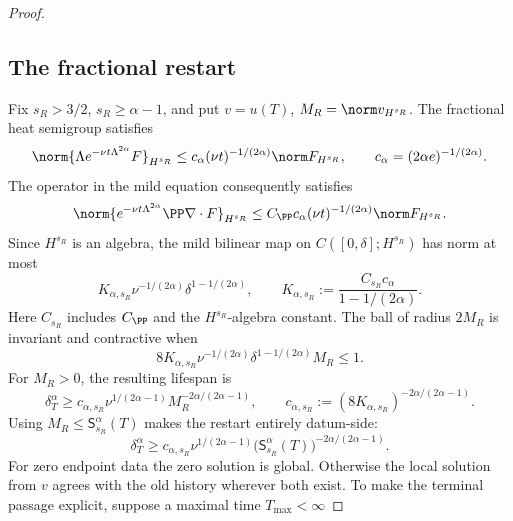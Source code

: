 \begin{proof}
\subsection{The fractional restart}

Fix \(s_R>3/2\), \(s_R\ge\alpha-1\), and put
\(v=u(T)\), \(M_R=\norm v_{H^{s_R}}\).  The fractional heat semigroup
satisfies
\begin{equation}
 \norm{\Lambda e^{-\nu t\Lambda^{2\alpha}}F}_{H^{s_R}}
 \le c_\alpha(\nu t)^{-1/(2\alpha)}\norm F_{H^{s_R}},
 \qquad c_\alpha=(2\alpha e)^{-1/(2\alpha)}.
 \label{eq:hyper-semigroup}
\end{equation}
The operator in the mild equation consequently satisfies
\begin{equation}
 \norm{e^{-\nu t\Lambda^{2\alpha}}\PP\nabla\cdot F}_{H^{s_R}}
 \le C_{\PP}c_\alpha(\nu t)^{-1/(2\alpha)}
       \norm F_{H^{s_R}}.
 \label{eq:hyper-mild-operator}
\end{equation}
Since \(H^{s_R}\) is an algebra, the mild bilinear map on
\(C([0,\delta];H^{s_R})\) has norm at most
\begin{equation}
 K_{\alpha,s_R}\nu^{-1/(2\alpha)}
 \delta^{1-1/(2\alpha)},
 \qquad
 K_{\alpha,s_R}
 :=\frac{C_{s_R}c_\alpha}{1-1/(2\alpha)}.
 \label{eq:hyper-bilinear-constant}
\end{equation}
Here \(C_{s_R}\) includes \(C_{\PP}\) and the \(H^{s_R}\)-algebra
constant.
The ball of radius \(2M_R\) is invariant and contractive when
\begin{equation}
 8K_{\alpha,s_R}\nu^{-1/(2\alpha)}
 \delta^{1-1/(2\alpha)}M_R\le1.
 \label{eq:hyper-contraction-condition}
\end{equation}
For \(M_R>0\), the resulting lifespan is
\begin{equation}
 \delta_T^\alpha
 \ge c_{\alpha,s_R}
 \nu^{1/(2\alpha-1)}
 M_R^{-2\alpha/(2\alpha-1)},
 \qquad
 c_{\alpha,s_R}:=(8K_{\alpha,s_R})^{-2\alpha/(2\alpha-1)}.
 \label{eq:hyper-restart}
\end{equation}
Using \(M_R\le\mathsf S_{s_R}^\alpha(T)\) makes the restart entirely
datum-side:
\begin{equation}
 \delta_T^\alpha
 \ge c_{\alpha,s_R}
 \nu^{1/(2\alpha-1)}
 \bigl(\mathsf S_{s_R}^\alpha(T)\bigr)^{-2\alpha/(2\alpha-1)}.
 \label{eq:hyper-restart-datum}
\end{equation}
For zero endpoint data the zero solution is global.  Otherwise the local
solution from \(v\) agrees with the old history wherever both exist.  To make
the terminal passage explicit, suppose a maximal time \(T_{\max}<\infty\)

\end{proof}

